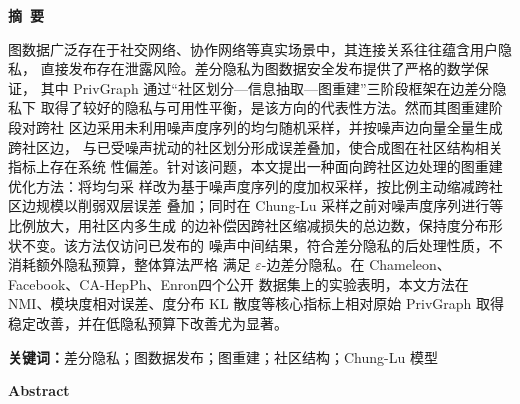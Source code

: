 \clearpage{}
\begin{center}
    \bfseries {} 摘~要
\end{center}

图数据广泛存在于社交网络、协作网络等真实场景中，其连接关系往往蕴含用户隐私，
直接发布存在泄露风险。差分隐私为图数据安全发布提供了严格的数学保证，
其中 PrivGraph 通过``社区划分—信息抽取—图重建''三阶段框架在边差分隐私下
取得了较好的隐私与可用性平衡，是该方向的代表性方法。然而其图重建阶段对跨社
区边采用未利用噪声度序列的均匀随机采样，并按噪声边向量全量生成跨社区边，
与已受噪声扰动的社区划分形成误差叠加，使合成图在社区结构相关指标上存在系统
性偏差。针对该问题，本文提出一种面向跨社区边处理的图重建优化方法：将均匀采
样改为基于噪声度序列的度加权采样，按比例主动缩减跨社区边规模以削弱双层误差
叠加；同时在 Chung-Lu 采样之前对噪声度序列进行等比例放大，用社区内多生成
的边补偿因跨社区缩减损失的总边数，保持度分布形状不变。该方法仅访问已发布的
噪声中间结果，符合差分隐私的后处理性质，不消耗额外隐私预算，整体算法严格
满足 $\varepsilon$-边差分隐私。在 Chameleon、Facebook、CA-HepPh、Enron四个公开
数据集上的实验表明，本文方法在 NMI、模块度相对误差、度分布 KL 散度等核心指标上相对原始 PrivGraph 取得稳定改善，并在低隐私预算下改善尤为显著。

\textbf{关键词：}差分隐私；图数据发布；图重建；社区结构；Chung-Lu 模型

\clearpage{}
\begin{center}
    \bfseries {} Abstract
\end{center}

